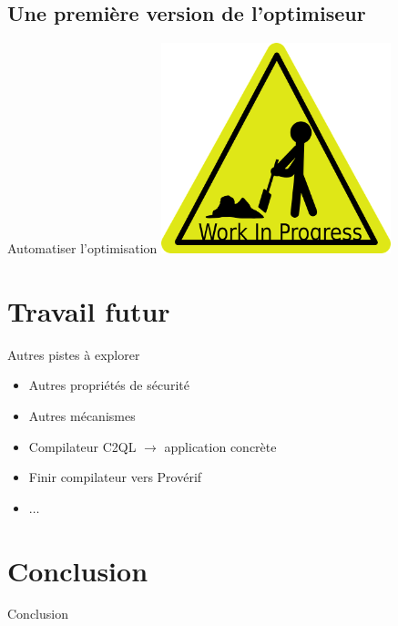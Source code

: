 \documentclass{beamer}
\begin{document}
\subsection{Une première version de l'optimiseur}
\begin{frame}{Automatiser l'optimisation}
\includegraphics[width = 0.5\textwidth]{work.png}
\end{frame}

\section{Travail futur}

\begin{frame}

\begin{block}{Autres pistes à explorer}
\begin{itemize}
\item Autres propriétés de sécurité
\item Autres mécanismes
\item Compilateur C2QL $\rightarrow$ application concrète
\item Finir compilateur vers Provérif
\item $\dots$
\end{itemize}
\end{block}

\end{frame}

\section*{Conclusion}
\begin{frame}{Conclusion}
\end{frame}
\end{document}
